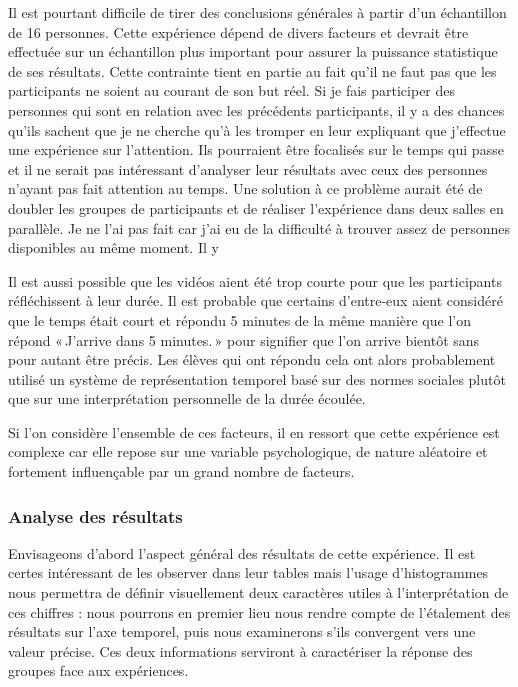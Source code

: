 \documentclass[12pt,fleqn,oneside,french,openany]{book} %
\begin{document}
Il est pourtant difficile de tirer des conclusions générales à partir d'un échantillon de 16 personnes. Cette expérience dépend de divers facteurs et devrait être effectuée sur un échantillon plus important pour assurer la puissance statistique de ses résultats. Cette contrainte tient en partie au fait qu'il ne faut pas que les participants ne soient au courant de son but réel. Si je fais participer des personnes qui sont en relation avec les précédents participants, il y a des chances qu'ils sachent que je ne cherche qu'à les tromper en leur expliquant que j'effectue une expérience sur l'attention. Ils pourraient être focalisés sur le temps qui passe et il ne serait pas intéressant d'analyser leur résultats avec ceux des personnes n'ayant pas fait attention au temps. Une solution à ce problème aurait été de doubler les groupes de participants et de réaliser l'expérience dans deux salles en parallèle. Je ne l'ai pas fait car j'ai eu de la difficulté à trouver assez de personnes disponibles au même moment. Il y 

Il est aussi possible que les vidéos aient été trop courte pour que les participants réfléchissent à leur durée. Il est probable que certains d'entre-eux aient considéré que le temps était court et répondu 5 minutes de la même manière que l'on répond «\,J'arrive dans 5 minutes.\,» pour signifier que l'on arrive bientôt sans pour autant être précis. Les élèves qui ont répondu cela ont alors probablement utilisé un système de représentation temporel basé sur des normes sociales plutôt que sur une interprétation personnelle de la durée écoulée.

Si l'on considère l'ensemble de ces facteurs, il en ressort que cette expérience est complexe car elle repose sur une variable psychologique, de nature aléatoire et fortement influençable par un grand nombre de facteurs.



\subsubsection{Analyse des résultats} \label{sssec:analyseResult1.1}
Envisageons d'abord l'aspect général des résultats de cette expérience. Il est certes intéressant de les observer dans leur tables mais l'usage d'histogrammes nous permettra de définir visuellement deux caractères utiles à l'interprétation de ces chiffres : nous pourrons en premier lieu nous rendre compte de l'étalement des résultats sur l'axe temporel, puis nous examinerons s'ils convergent vers une valeur précise. Ces deux informations serviront à caractériser la réponse des groupes face aux expériences.
\end{document}
